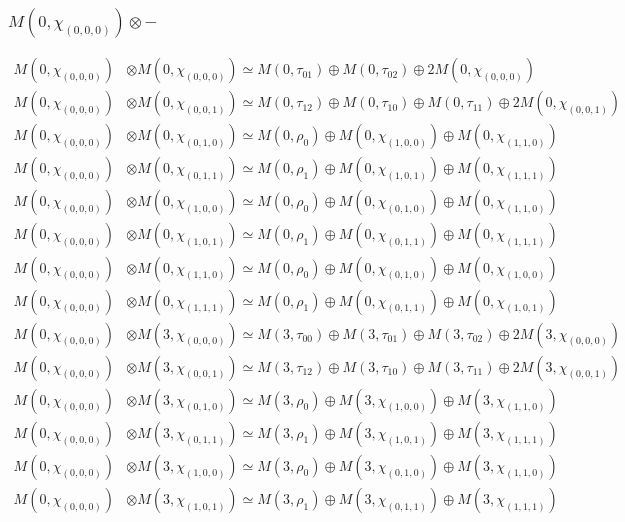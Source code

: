 \subsubsection{$ M(0,\chi_{(0,0,0)})\otimes -$}
\begin{align*}
M(0,\chi_{(0,0,0)}) &\otimes M(0,\chi_{(0,0,0)}) \simeq M(0,\tau_{01}) \oplus M(0,\tau_{02}) \oplus 2 M(0,\chi_{(0,0,0)}) \\
M(0,\chi_{(0,0,0)}) &\otimes M(0,\chi_{(0,0,1)}) \simeq M(0,\tau_{12}) \oplus M(0,\tau_{10}) \oplus M(0,\tau_{11}) \oplus 2 M(0,\chi_{(0,0,1)}) \\
M(0,\chi_{(0,0,0)}) &\otimes M(0,\chi_{(0,1,0)}) \simeq M(0,\rho_{0}) \oplus M(0,\chi_{(1,0,0)}) \oplus M(0,\chi_{(1,1,0)}) \\
M(0,\chi_{(0,0,0)}) &\otimes M(0,\chi_{(0,1,1)}) \simeq M(0,\rho_{1}) \oplus M(0,\chi_{(1,0,1)}) \oplus M(0,\chi_{(1,1,1)}) \\
M(0,\chi_{(0,0,0)}) &\otimes M(0,\chi_{(1,0,0)}) \simeq M(0,\rho_{0}) \oplus M(0,\chi_{(0,1,0)}) \oplus M(0,\chi_{(1,1,0)}) \\
M(0,\chi_{(0,0,0)}) &\otimes M(0,\chi_{(1,0,1)}) \simeq M(0,\rho_{1}) \oplus M(0,\chi_{(0,1,1)}) \oplus M(0,\chi_{(1,1,1)}) \\
M(0,\chi_{(0,0,0)}) &\otimes M(0,\chi_{(1,1,0)}) \simeq M(0,\rho_{0}) \oplus M(0,\chi_{(0,1,0)}) \oplus M(0,\chi_{(1,0,0)}) \\
M(0,\chi_{(0,0,0)}) &\otimes M(0,\chi_{(1,1,1)}) \simeq M(0,\rho_{1}) \oplus M(0,\chi_{(0,1,1)}) \oplus M(0,\chi_{(1,0,1)}) \\
M(0,\chi_{(0,0,0)}) &\otimes M(3,\chi_{(0,0,0)}) \simeq M(3,\tau_{00}) \oplus M(3,\tau_{01}) \oplus M(3,\tau_{02}) \oplus 2 M(3,\chi_{(0,0,0)}) \\
M(0,\chi_{(0,0,0)}) &\otimes M(3,\chi_{(0,0,1)}) \simeq M(3,\tau_{12}) \oplus M(3,\tau_{10}) \oplus M(3,\tau_{11}) \oplus 2 M(3,\chi_{(0,0,1)}) \\
M(0,\chi_{(0,0,0)}) &\otimes M(3,\chi_{(0,1,0)}) \simeq M(3,\rho_{0}) \oplus M(3,\chi_{(1,0,0)}) \oplus M(3,\chi_{(1,1,0)}) \\
M(0,\chi_{(0,0,0)}) &\otimes M(3,\chi_{(0,1,1)}) \simeq M(3,\rho_{1}) \oplus M(3,\chi_{(1,0,1)}) \oplus M(3,\chi_{(1,1,1)}) \\
M(0,\chi_{(0,0,0)}) &\otimes M(3,\chi_{(1,0,0)}) \simeq M(3,\rho_{0}) \oplus M(3,\chi_{(0,1,0)}) \oplus M(3,\chi_{(1,1,0)}) \\
M(0,\chi_{(0,0,0)}) &\otimes M(3,\chi_{(1,0,1)}) \simeq M(3,\rho_{1}) \oplus M(3,\chi_{(0,1,1)}) \oplus M(3,\chi_{(1,1,1)}) \\

\end{align*}
